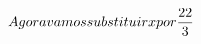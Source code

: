 \documentclass[preview]{standalone}
\begin{document}
\begin{align*}
\special{dvisvgm:raw <g id='unique000'>}Agora vamos substituir x por \frac{22}{3}\special{dvisvgm:raw </g>}
\end{align*}
\end{document}
